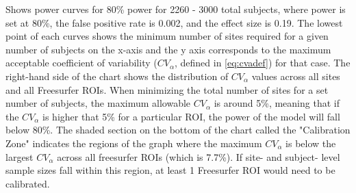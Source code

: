 \label{fig:cv_j} Shows power curves for 80\% power for 2260 - 3000 total subjects, where power is set at 80\%, the false positive rate is 0.002, and the effect size is 0.19. The lowest point of each curves shows the minimum number of sites required for a given number of subjects on the x-axis and the y axis corresponds to the maximum acceptable coefficient of variability ($CV_{\alpha}$, defined in \ref{eq:cvadef}) for that case. The right-hand side of the chart shows the distribution of $CV_{\alpha}$ values across all sites and all Freesurfer ROIs. When minimizing the total number of sites for a set number of subjects, the maximum allowable $CV_{\alpha}$ is around 5\%, meaning that if the $CV_{\alpha}$ is higher that 5\% for a particular ROI, the power of the model will fall below 80\%. The shaded section on the bottom of the chart called the "Calibration Zone" indicates the regions of the graph where the maximum $CV_{\alpha}$ is below the largest $CV_{\alpha}$ across all freesurfer ROIs (which is 7.7\%). If site- and subject- level sample sizes fall within this region, at least 1 Freesurfer ROI would need to be calibrated.